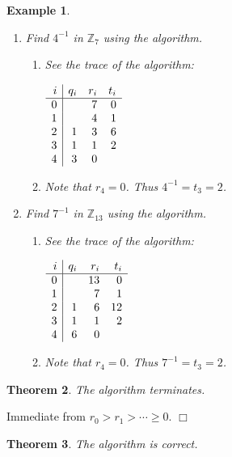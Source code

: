 \documentclass{article}%
\newtheorem{theorem}{Theorem}
\newtheorem{example}[theorem]{Example}
\newenvironment{proof}{\noindent{\em Proof:}}{$\Box$~\\}
\begin{document}
\begin{example}
\ 

\begin{enumerate}
\item Find $4^{-1}$ in $\mathbb{Z}_{7}$ using the algorithm.

\begin{enumerate}
\item See the trace of the algorithm:

$%
\begin{array}
[c]{r|rrr}%
i & q_{i} & r_{i} & t_{i}\\\hline
0 &  & 7 & 0\\
1 &  & 4 & 1\\
2 & 1 & 3 & 6\\
3 & 1 & 1 & 2\\
4 & 3 & 0 &
\end{array}
$

\item Note that $r_{4}=0$. Thus $4^{-1}=t_{3}=2$.
\end{enumerate}

\item Find $7^{-1}$ in $\mathbb{Z}_{13}$ using the algorithm.

\begin{enumerate}
\item See the trace of the algorithm:

$%
\begin{array}
[c]{r|rrr}%
i & q_{i} & r_{i} & t_{i}\\\hline
0 &  & 13 & 0\\
1 &  & 7 & 1\\
2 & 1 & 6 & 12\\
3 & 1 & 1 & 2\\
4 & 6 & 0 &
\end{array}
$
\item Note that $r_4=0$. Thus $7^{-1}=t_3=2$.
\end{enumerate}
\end{enumerate}
\end{example}

\begin{theorem}
The algorithm terminates.
\end{theorem}

\begin{proof}
Immediate from $r_{0}>r_{1}>\cdots\geq0$.
\end{proof}

\begin{theorem}
The algorithm is correct.
\end{theorem}
\end{document}
